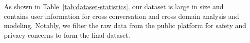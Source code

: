 
As shown in Table~\ref{tab:dataset-statistics}, our dataset is large in size and contains user information for cross conversation and cross domain analysis and modeling.
Notably, we filter the raw data from the public platform for safety and privacy concerns to form the final dataset. 


